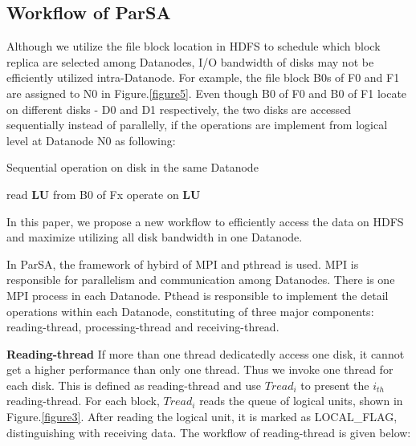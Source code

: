 \documentclass[preprint,12pt]{elsarticle}
\begin{document}
\subsection{Workflow of ParSA}
Although we utilize the file block location in HDFS to schedule which block replica are selected among Datanodes, I/O bandwidth of disks may 
not be efficiently utilized intra-Datanode. For example, the file block B0s of F0 and F1 are assigned to N0 in Figure.\ref{figure5}. Even
though B0 of F0 and B0 of F1 locate on different disks - D0 and D1 respectively, the two disks are accessed sequentially instead of 
parallelly, if the operations are implement from logical level at Datanode N0 as following:

\begin{algorithm}[htb]
\caption{Sequential operation on disk in the same Datanode} 
\label{alg:sequential-operation}
\begin{algorithmic}
\STATE read \textbf{LU} from B0 of Fx
\STATE operate on \textbf{LU} 
\ENDFOR
\ENDFOR
\end{algorithmic}
\end{algorithm}

In this paper, we propose a new workflow to efficiently access the data on HDFS and maximize utilizing all disk bandwidth in one 
Datanode. \par
In ParSA, the framework of hybird of MPI and pthread is used. MPI is responsible for parallelism and communication among Datanodes. There
is one MPI process in each Datanode. Pthead is responsible to implement the detail operations within each Datanode, constituting of 
three major components: reading-thread, processing-thread and receiving-thread. \par
\textbf{Reading-thread} If more than one thread dedicatedly access one disk, it cannot get a higher performance than only one thread. 
Thus we invoke one thread for each disk. This is defined as reading-thread and use $Tread_i$ to present the $i_{th}$ reading-thread. 
For each block, $Tread_i$ reads the queue of logical units, shown in Figure.\ref{figure3}. After reading the logical unit, it is 
marked as LOCAL\_FLAG, distinguishing with receiving data. The workflow of reading-thread is given below:
\end{document}
